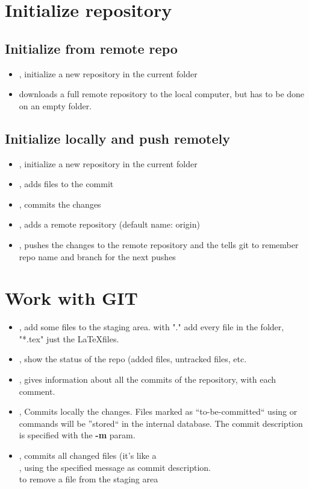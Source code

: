 \section{Initialize repository}
\subsection{Initialize from remote repo}
\begin{itemize}
\item {}, initialize a new repository in the current folder 
\item {} downloads a full remote repository to the local computer, but has to be done on an empty folder.
\end{itemize}
\subsection{Initialize locally and push remotely}
\begin{itemize}
	\item {}, initialize a new repository in the current folder 
	\item {}, adds files to the commit
	\item {}, commits the changes
	\item {}, adds a remote repository (default name: origin)
	\item {}, pushes the changes to the remote repository and the  tells git to remember repo name and branch for the next pushes
\end{itemize}

\section{Work with GIT}
\begin{itemize}
\item {}, add some files to the staging area.  with "." add every file in the folder, "*.tex" just the \LaTeX  files.
\item {}, show the status of the repo (added files, untracked files, etc.
\item {}, gives information about all the commits of the repository, with each comment.
\item {}, Commits locally the changes. Files marked as ``to-be-committed`` using  or  commands will be ''stored`` in the internal database. The commit description is specified with the \textbf{-m} param.
\item {}, commits all changed files (it's like a \\ , using the specified message as commit description.
\\  to remove a file from the staging area 
\end{itemize}

